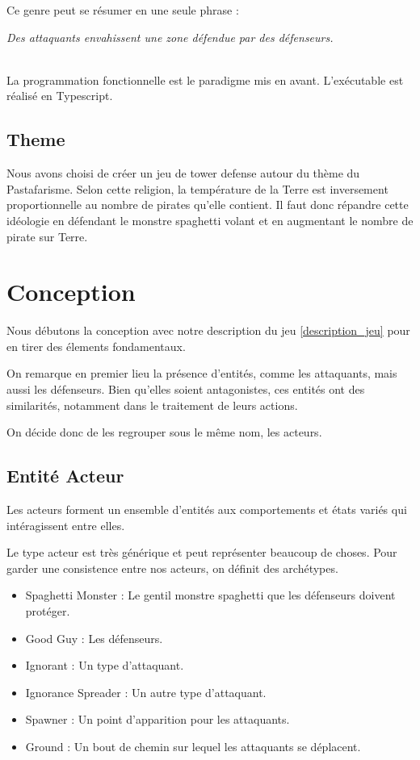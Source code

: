 \documentclass{article}
\begin{document}
Ce genre peut se résumer en une seule phrase :\\[8px]
\centerline{\emph{\label{description_jeu} Des attaquants envahissent une zone défendue par des défenseurs.}}\\

La programmation fonctionnelle est le paradigme mis en avant.
L'exécutable est réalisé en Typescript.

\subsection{Theme}
Nous avons choisi de créer un jeu de tower defense autour du thème
du Pastafarisme.
Selon cette religion, la température de la Terre est inversement proportionnelle 
au nombre de pirates qu’elle contient.
Il faut donc répandre cette idéologie en défendant le monstre spaghetti volant et 
en augmentant le nombre de pirate sur Terre.

\section{Conception}

Nous débutons la conception avec notre description du jeu \ref{description_jeu} 
pour en tirer des élements fondamentaux.

On remarque en premier lieu la présence d'entités, comme les attaquants, mais aussi les 
défenseurs. Bien qu'elles soient antagonistes, ces entités ont des similarités, notamment 
dans le traitement de leurs actions. 

On décide donc de les regrouper sous le même nom, les acteurs.


\subsection{Entité Acteur}


Les acteurs forment un ensemble d'entités aux comportements et états variés 
qui intéragissent entre elles.

Le type acteur est très générique et peut représenter beaucoup de choses.
Pour garder une consistence entre nos acteurs, on définit des archétypes.

\begin{itemize}
   \item Spaghetti Monster : Le gentil monstre spaghetti que les défenseurs doivent protéger.
   \item Good Guy : Les défenseurs.
   \item Ignorant : Un type d'attaquant.
   \item Ignorance Spreader : Un autre type d'attaquant.
   \item Spawner : Un point d'apparition pour les attaquants.
   \item Ground : Un bout de chemin sur lequel les attaquants se déplacent.
\end{itemize}
\end{document}
